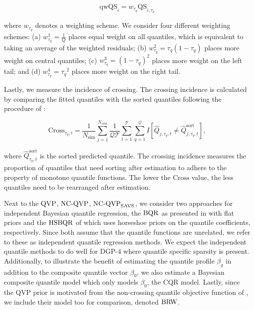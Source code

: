 \begin{equation}\label{eq:qwQS}
    \mathrm{qwQS}_i = w_{\tau_q} \mathrm{QS}_{i,\tau_q}%
\end{equation}

\noindent where $w_{\tau_q}$ denotes a weighting scheme. We consider four different weighting schemes: (a) $w_{\tau_q}^1=\frac{1}{Q}$ places equal weight on all quantiles, which is equivalent to taking an average of the weighted residuals; (b) $w_{\tau_q}^2={\tau_q}(1-{\tau_q})$ places more weight on central quantiles; (c) $w_{\tau_q}^3=(1-{\tau_q})^2$ places more weight on the left tail; and (d) $w_{\tau_q}^4={\tau_q}^2$ places more weight on the right tail.  
%

Lastly, we measure the incidence of crossing. The crossing incidence is calculated by comparing the fitted quantiles with the sorted quantiles following the procedure of \citet{chernozhukov2010quantile}:

\begin{equation}\label{eq:cross-i}
    \mathrm{Cross}_{\tau_q,i}=\frac{1}{N_{\mathrm{sim}}} \sum_{j =1}^{N_{sim}} \frac{1}{\mathcal{Q}\mathcal{T}}\sum^{\mathcal{T}}_{t=1}\sum^{\mathcal{Q}}_{q=1}I[{\hat{Q}_{{j,\tau_q,t}}\neq\hat{Q}^{\mathrm{sort}}_{{j,\tau_q,t}}}],
\end{equation}

\noindent where $\hat{Q}^{\mathrm{sort}}_{{\tau_q,t}}$ is the sorted predicted quantile. The crossing incidence measures the proportion of quantiles that need sorting after estimation to adhere to the property of monotone quantile functions. The lower the $\mathrm{Cross}$ value, the less quantiles need to be rearranged after estimation.%

Next to the $\operatorname{QVP}$, $\operatorname{NC-QVP}$, $\operatorname{NC-QVP}_{\mathrm{SAVS}}$, we consider two approaches for independent Bayesian quantile regression, the $\operatorname{BQR}$ as presented in \citet{kozumi2011gibbs} with flat priors and the $\operatorname{HSBQR}$ of \citet{kohns2024horseshoe} which uses horseshoe priors on the quantile coefficients, respectively. 
Since both assume that the quantile functions are unrelated, we refer to these as independent quantile regression methods. We expect the independent quantile methods to do well for $\mathrm{DGP}$-4 where quantile specific sparsity is present. Additionally, to illustrate the benefit of estimating the quantile profile $\beta_q$ in addition to the composite quantile vector $\beta_0$, we also estimate a Bayesian composite quantile model which only models $\beta_0$, the $\mathrm{CQR}$ model. 
%
Lastly, since the QVP prior is motivated from the non-crossing quantile objective function of \citet{bondell2010noncrossing}, we include their model too for comparison, denoted $\operatorname{BRW}$.
